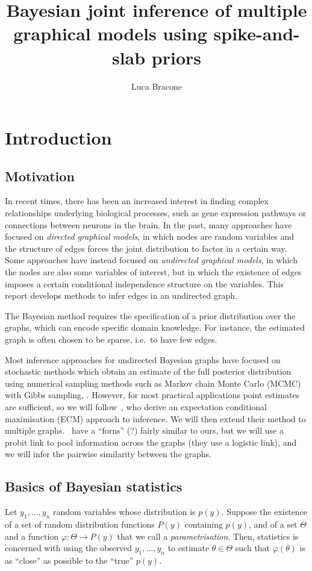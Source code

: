 \documentclass[a4paper, 11pt, oneside]{report}
\author{Luca Bracone}
\title{Bayesian joint inference of multiple graphical models using
spike-and-slab priors}
\newcommand{\1}{\mathds{1}}
\begin{document}
\maketitle

\chapter{Introduction}
\section{Motivation}
In recent times, there has been an increased interest in finding complex
relationships underlying biological processes, such as gene expression pathways
or connections between neurons in the brain. In the past, many approaches have
focused on \emph{directed graphical models}, in which nodes are random
variables and the structure of edges forces the joint distribution to factor in
a certain way. Some approaches have instead focused on \emph{undirected
	graphical models}, in which the nodes are also some variables of interest, but
in which the existence of edges imposes a certain conditional independence
structure on the variables. This report develops methods to infer edges in an
undirected graph.

The Bayesian method requires the specification of a prior distribution over the
graphs, which can encode specific domain knowledge. For instance, the estimated
graph is often chosen to be sparse,
i.e.\ to have few edges.

Most inference approaches for undirected Bayesian graphs have focused on
stochastic methods which obtain an estimate of the full posterior distribution
using numerical sampling methods such as Markov chain Monte Carlo (MCMC) with
Gibbs sampling, \parencite{wang-2015}. However, for most practical applications
point estimates are sufficient, so we will follow~\cite{limcco-2017}, who
derive an expectation conditional maximisation (ECM) approach to inference. We
will then extend their method to multiple graphs.~\cite{luke2017} have a
``forns'' (?) fairly similar to ours, but we will use a probit link to pool
information across the graphs (they use a logistic link), and we will infer the
pairwise similarity between the graphs.

\section{Basics of Bayesian statistics}
Let $y_1, \dots, y_n$ random variables whose distribution is $p(y)$. Suppose
the existence of a set of random distribution functions $P(y)$ containing
$p(y)$, and of a set $\Theta$ and a function $\varphi: \Theta \to P(y)$ that we
call a \emph{parametrisation}. Then, statistics is concerned with using the
observed $y_1,\dots,y_n$ to estimate $\theta \in \Theta$ such that
$\varphi(\theta)$ is as ``close'' as possible to the ``true'' $p(y)$.
\end{document}
